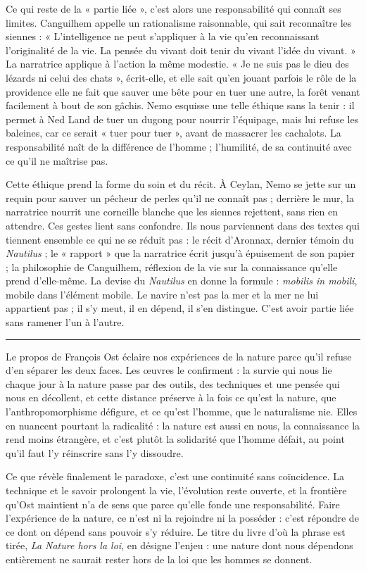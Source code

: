 \documentclass[11pt,a4paper]{article}
\begin{document}
Ce qui reste de la « partie liée », c'est alors une responsabilité qui connaît ses limites. Canguilhem appelle un rationalisme raisonnable, qui sait reconnaître les siennes : « L'intelligence ne peut s'appliquer à la vie qu'en reconnaissant l'originalité de la vie. La pensée du vivant doit tenir du vivant l'idée du vivant. » La narratrice applique à l'action la même modestie. « Je ne suis pas le dieu des lézards ni celui des chats », écrit-elle, et elle sait qu'en jouant parfois le rôle de la providence elle ne fait que sauver une bête pour en tuer une autre, la forêt venant facilement à bout de son gâchis. Nemo esquisse une telle éthique sans la tenir : il permet à Ned Land de tuer un dugong pour nourrir l'équipage, mais lui refuse les baleines, car ce serait « tuer pour tuer », avant de massacrer les cachalots. La responsabilité naît de la différence de l'homme ; l'humilité, de sa continuité avec ce qu'il ne maîtrise pas.

Cette éthique prend la forme du soin et du récit. À Ceylan, Nemo se jette sur un requin pour sauver un pêcheur de perles qu'il ne connaît pas ; derrière le mur, la narratrice nourrit une corneille blanche que les siennes rejettent, sans rien en attendre. Ces gestes lient sans confondre. Ils nous parviennent dans des textes qui tiennent ensemble ce qui ne se réduit pas : le récit d'Aronnax, dernier témoin du \emph{Nautilus} ; le « rapport » que la narratrice écrit jusqu'à épuisement de son papier ; la philosophie de Canguilhem, réflexion de la vie sur la connaissance qu'elle prend d'elle-même. La devise du \emph{Nautilus} en donne la formule : \emph{mobilis in mobili}, mobile dans l'élément mobile. Le navire n'est pas la mer et la mer ne lui appartient pas ; il s'y meut, il en dépend, il s'en distingue. C'est avoir partie liée sans ramener l'un à l'autre.

\begin{center}\rule{0.5\linewidth}{0.5pt}\end{center}

Le propos de François Ost éclaire nos expériences de la nature parce qu'il refuse d'en séparer les deux faces. Les œuvres le confirment : la survie qui nous lie chaque jour à la nature passe par des outils, des techniques et une pensée qui nous en décollent, et cette distance préserve à la fois ce qu'est la nature, que l'anthropomorphisme défigure, et ce qu'est l'homme, que le naturalisme nie. Elles en nuancent pourtant la radicalité : la nature est aussi en nous, la connaissance la rend moins étrangère, et c'est plutôt la solidarité que l'homme défait, au point qu'il faut l'y réinscrire sans l'y dissoudre.

Ce que révèle finalement le paradoxe, c'est une continuité sans coïncidence. La technique et le savoir prolongent la vie, l'évolution reste ouverte, et la frontière qu'Ost maintient n'a de sens que parce qu'elle fonde une responsabilité. Faire l'expérience de la nature, ce n'est ni la rejoindre ni la posséder : c'est répondre de ce dont on dépend sans pouvoir s'y réduire. Le titre du livre d'où la phrase est tirée, \emph{La Nature hors la loi}, en désigne l'enjeu : une nature dont nous dépendons entièrement ne saurait rester hors de la loi que les hommes se donnent.
\end{document}
